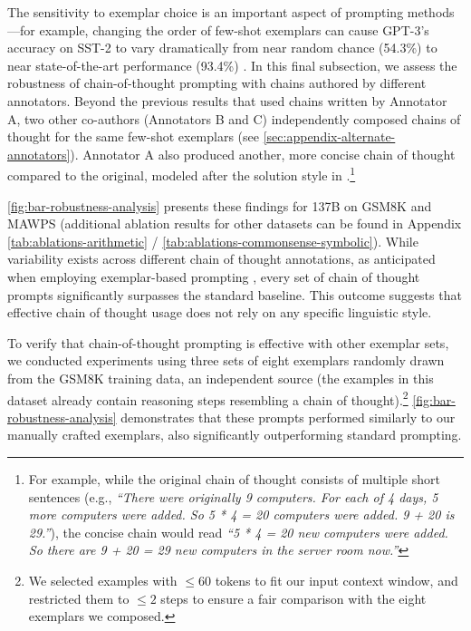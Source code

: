 The sensitivity to exemplar choice is an important aspect of prompting methods—for example, changing the order of few-shot exemplars can cause GPT-3’s accuracy on SST-2 to vary dramatically from near random chance (54.3\%) to near state-of-the-art performance (93.4\%) \citep{zhao2021calibrate}. In this final subsection, we assess the robustness of chain-of-thought prompting with chains authored by different annotators. Beyond the previous results that used chains written by Annotator A, two other co-authors (Annotators B and C) independently composed chains of thought for the same few-shot exemplars (see \cref{sec:appendix-alternate-annotators}).
Annotator A also produced another, more concise chain of thought compared to the original, modeled after the solution style in \citet{cobbe2021training}.\footnote{For example, while the original chain of thought consists of multiple short sentences (e.g., \textit{``There were originally 9 computers. For each of 4 days, 5 more computers were added. So 5 * 4 = 20 computers were added. 9 + 20 is 29.''}), the concise chain would read \textit{``5 * 4 = 20 new computers were added. So there are 9 + 20 = 29 new computers in the server room now.''}}

\cref{fig:bar-robustness-analysis} presents these findings for \lamda{} 137B on GSM8K and MAWPS (additional ablation results for other datasets can be found in Appendix \cref{tab:ablations-arithmetic} / \cref{tab:ablations-commonsense-symbolic}). While variability exists across different chain of thought annotations, as anticipated when employing exemplar-based prompting \citep{le-scao-rush-2021-many,reynolds2021prompt,zhao2021calibrate}, every set of chain of thought prompts significantly surpasses the standard baseline. This outcome suggests that effective chain of thought usage does not rely on any specific linguistic style.

To verify that chain-of-thought prompting is effective with other exemplar sets, we conducted experiments using three sets of eight exemplars randomly drawn from the GSM8K training data, an independent source (the examples in this dataset already contain reasoning steps resembling a chain of thought).\footnote{We selected examples with $\leq 60$ tokens to fit our input context window, and restricted them to $\leq 2$ steps to ensure a fair comparison with the eight exemplars we composed.} \cref{fig:bar-robustness-analysis} demonstrates that these prompts performed similarly to our manually crafted exemplars, also significantly outperforming standard prompting.

